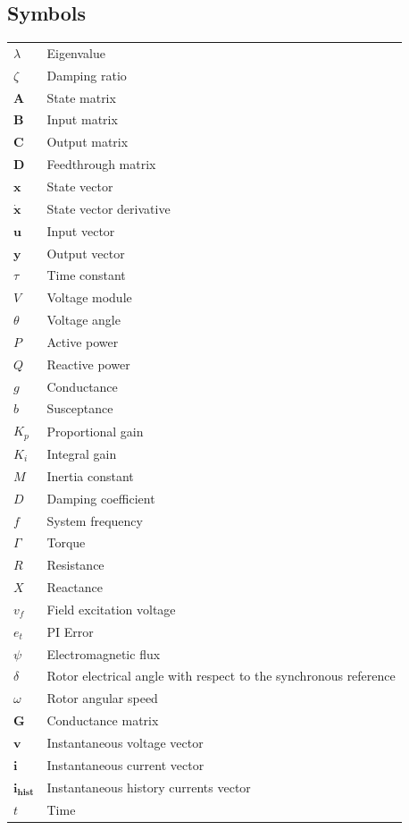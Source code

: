 \subsection*{Symbols}
\begin{tabular}{l@{\hspace{1.95cm}} l}
  $\lambda$ & Eigenvalue \\
  $\zeta$ & Damping ratio \\
  $\bm{A}$ & State matrix \\
  $\bm{B}$ & Input matrix \\
  $\bm{C}$ & Output matrix \\
  $\bm{D}$ & Feedthrough matrix \\
  $\bm{x}$ & State vector \\
  $\bm{\dot{x}}$ & State vector derivative\\
  $\bm{u}$ & Input vector \\
  $\bm{y}$ & Output vector \\
  $\tau$ & Time constant \\
  $V$ & Voltage module \\
  $\theta$ & Voltage angle\\
  $P$ & Active power\\
  $Q$ & Reactive power\\
  $g$ & Conductance\\
  $b$ & Susceptance\\
  $K_p$ & Proportional gain\\
  $K_i$ & Integral gain\\
  $M$ & Inertia constant\\
  $D$ & Damping coefficient\\
  $f$ & System frequency\\
  $\Gamma$ & Torque \\
  $R$ & Resistance \\
  $X$ & Reactance\\
  $v_f$ & Field excitation voltage\\
  $e_t$ & PI Error\\
  $\psi$ & Electromagnetic flux\\
  $\delta$ & Rotor electrical angle with respect to the synchronous reference\\
  $\omega$ & Rotor angular speed\\
  $\bm{G}$ & Conductance matrix\\
  $\bm{v}$ & Instantaneous voltage vector\\
  $\bm{i}$ & Instantaneous current vector\\
  $\bm{i_{\text{hist}}}$ & Instantaneous history currents vector\\
  $t$ & Time \\
\end{tabular}
